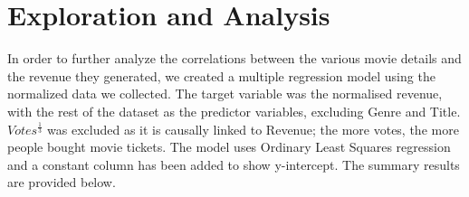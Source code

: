 \section{Exploration and Analysis}
    In order to further analyze the correlations between the various movie details
    and the revenue they generated, we created a multiple regression model using the
    normalized data we collected. 
    The target variable was the normalised revenue, with the rest of the dataset as the 
        predictor variables, excluding Genre and Title.
    $Votes^\frac{1}{3}$ was excluded as it is causally linked to Revenue; the more votes, the more people bought movie tickets. 
    The model uses Ordinary Least Squares regression and a constant column has been added to show y-intercept.
    The summary results are provided below.
